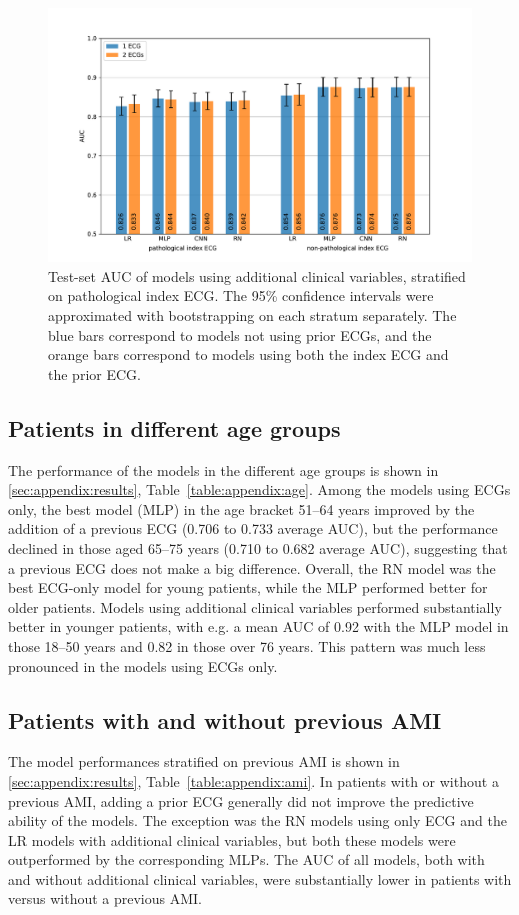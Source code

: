 \documentclass[preprint]{elsarticle}
\begin{document}
\begin{figure}[h!]
\includegraphics[width=\linewidth]{figures/path_results.pdf}
\caption{Test-set AUC of models using additional clinical variables, stratified on pathological index ECG. The 95\% confidence intervals were approximated with bootstrapping on each stratum separately. The blue bars correspond to models not using prior ECGs, and the orange bars correspond to models using both the index ECG and the prior ECG.}
\label{fig:pathresults}
\end{figure}

\subsection{Patients in different age groups}
The performance of the models in the different age groups is shown in \ref{sec:appendix:results}, Table~\ref{table:appendix:age}. Among the models using ECGs only, the best model (MLP) in the age bracket 51--64 years improved by the addition of a previous ECG (0.706 to 0.733 average AUC), but the performance declined in those aged 65--75 years (0.710 to 0.682 average AUC), suggesting that a previous ECG does not make a big difference. Overall, the RN model was the best ECG-only model for young patients, while the MLP performed better for older patients. Models using additional clinical variables performed substantially better in younger patients, with e.g. a mean AUC of 0.92 with the MLP model in those 18--50 years and 0.82 in those over 76 years. This pattern was much less pronounced in the models using ECGs only.

\subsection{Patients with and without previous AMI}
The model performances stratified on previous AMI is shown in \ref{sec:appendix:results}, Table~\ref{table:appendix:ami}. In patients with or without a previous AMI, adding a prior ECG generally did not improve the predictive ability of the models. The exception was the RN models using only ECG and the LR models with additional clinical variables, but both these models were outperformed by the corresponding MLPs. The AUC of all models, both with and without additional clinical variables, were substantially lower in patients with versus without a previous AMI. 
\end{document}
